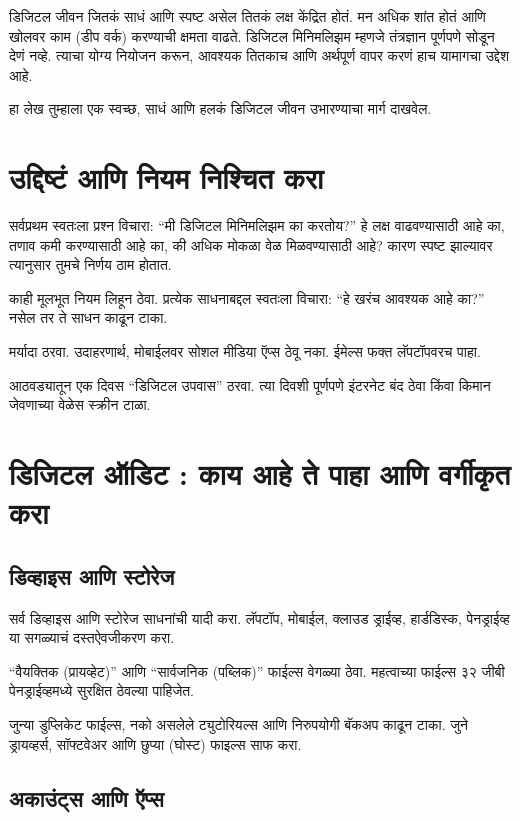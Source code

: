 डिजिटल जीवन जितकं साधं आणि स्पष्ट असेल तितकं लक्ष केंद्रित होतं. मन अधिक शांत होतं आणि खोलवर काम (डीप वर्क) करण्याची क्षमता वाढते. डिजिटल मिनिमलिझम म्हणजे तंत्रज्ञान पूर्णपणे सोडून देणं नव्हे. त्याचा योग्य नियोजन करून, आवश्यक तितकाच आणि अर्थपूर्ण वापर करणं हाच यामागचा उद्देश आहे.

हा लेख तुम्हाला एक स्वच्छ, साधं आणि हलकं डिजिटल जीवन उभारण्याचा मार्ग दाखवेल.

\section*{उद्दिष्टं आणि नियम निश्चित करा}

सर्वप्रथम स्वतःला प्रश्न विचारा: “मी डिजिटल मिनिमलिझम का करतोय?” हे लक्ष वाढवण्यासाठी आहे का, तणाव कमी करण्यासाठी आहे का, की अधिक मोकळा वेळ मिळवण्यासाठी आहे? कारण स्पष्ट झाल्यावर त्यानुसार तुमचे निर्णय ठाम होतात.

काही मूलभूत नियम लिहून ठेवा. प्रत्येक साधनाबद्दल स्वतःला विचारा: “हे खरंच आवश्यक आहे का?” नसेल तर ते साधन काढून टाका.

मर्यादा ठरवा. उदाहरणार्थ, मोबाईलवर सोशल मीडिया ऍप्स ठेवू नका. ईमेल्स फक्त लॅपटॉपवरच पाहा.

आठवड्यातून एक दिवस “डिजिटल उपवास” ठरवा. त्या दिवशी पूर्णपणे इंटरनेट बंद ठेवा किंवा किमान जेवणाच्या वेळेस स्क्रीन टाळा.



\section*{डिजिटल ऑडिट : काय आहे ते पाहा आणि वर्गीकृत करा}

\subsection*{डिव्हाइस आणि स्टोरेज}

सर्व डिव्हाइस आणि स्टोरेज साधनांची यादी करा. लॅपटॉप, मोबाईल, क्लाउड ड्राईव्ह, हार्डडिस्क, पेनड्राईव्ह या सगळ्याचं दस्तऐवजीकरण करा.

“वैयक्तिक (प्रायव्हेट)” आणि “सार्वजनिक (पब्लिक)” फाईल्स वेगळ्या ठेवा. महत्वाच्या फाईल्स ३२ जीबी पेनड्राईव्हमध्ये सुरक्षित ठेवल्या पाहिजेत.

जुन्या डुप्लिकेट फाईल्स, नको असलेले ट्युटोरियल्स आणि निरुपयोगी बॅकअप काढून टाका. जुने ड्रायव्हर्स, सॉफ्टवेअर आणि छुप्या (घोस्ट) फाइल्स साफ करा.

\subsection*{अकाउंट्स आणि ऍप्स}


